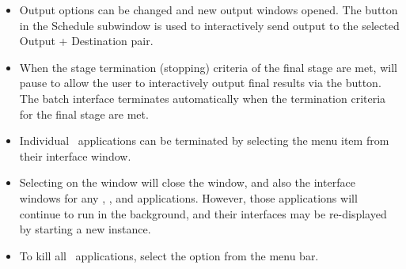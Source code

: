 \begin{list}{}{\setlength{\labelwidth}{0pt}
               \setlength{\leftmargin}{0pt}
               \setlength{\rightmargin}{\leftmargin}
               \setlength{\itemsep}{0pt}}
\begin{description}
\begin{itemize}
\begin{itemize}
         \item {\bf Pause:}  Click anytime to stop the solver.  Continue
             simulation from paused point with ,  or
             .
         \item {\bf Stage:}  Interactively change the current stage
             index by either typing the desired stage number (counting
             from 0) into the  entry box or by moving the
             associated slider.
       \end{itemize}
       \item Output options can be changed and new output windows
             opened.  The  button in the  Schedule
             subwindow is used to interactively send output to the
             selected Output + Destination pair.
       \item When the stage termination (stopping) criteria of the
             final stage are met,  will pause to allow the
             user to interactively output final results via the
              button.  The batch interface 
             terminates automatically when the termination criteria for
             the final stage are met.
    \end{itemize}
  \end{description}
  \item {}
  \begin{itemize}
    \item Individual \OOMMF\ applications can be terminated by selecting 
       the  menu item from their interface window.
    \item Selecting  on the  window
       will close the  window, and also the interface
       windows for any , , and 
       applications.  However, those applications will continue to run
       in the background, and their interfaces may be re-displayed by
       starting a new  instance.
    \item To kill all \OOMMF\ applications, select the
        option from the 
       menu bar.
  \end{itemize}
\end{list}
